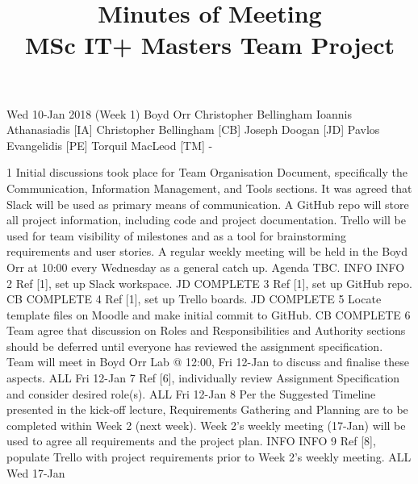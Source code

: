 \documentclass[a4paper, 12pt]{article}
\title{Minutes of Meeting \\ MSc IT+ Masters Team Project}
\date{}
\begin{document}
	\maketitle
	\momtoptable
	{Wed 10-Jan 2018 (Week 1)}
	{Boyd Orr}
	{Christopher Bellingham}
	{Ioannis Athanasiadis [IA]\newline
	Christopher Bellingham [CB]\newline
	Joseph Doogan [JD]\newline
	Pavlos Evangelidis [PE]\newline
	Torquil MacLeod [TM]}
	{-}

	\begin{momitems}
		\momitem
		{1}
		{Initial discussions took place for Team Organisation Document, specifically the Communication, Information Management, and Tools sections. It was agreed that Slack will be used as primary means of communication. A GitHub repo will store all project information, including code and project documentation. Trello will be used for team visibility of milestones and as a tool for brainstorming requirements and user stories. A regular weekly meeting will be held in the Boyd Orr at 10:00 every Wednesday as a general catch up. Agenda TBC.}
		{INFO}
		{INFO}
		\momitem
		{2}
		{Ref [1], set up Slack workspace.}
		{JD}
		{COMPLETE}
		\momitem
		{3}
		{Ref [1], set up GitHub repo.}
		{CB}
		{COMPLETE}
		\momitem
		{4}
		{Ref [1], set up Trello boards.}
		{JD}
		{COMPLETE}
		\momitem
		{5}
		{Locate template files on Moodle and make initial commit to GitHub.}
		{CB}
		{COMPLETE}
		\momitem
		{6}
		{Team agree that discussion on Roles and Responsibilities and Authority sections should be deferred until everyone has reviewed the assignment specification. Team will meet in Boyd Orr Lab @ 12:00, Fri 12-Jan to discuss and finalise these aspects.}
		{ALL}
		{Fri 12-Jan}
		\momitem
		{7}
		{Ref [6], individually review Assignment Specification and consider desired role(s).}
		{ALL}
		{Fri 12-Jan}
		\momitem
		{8}
		{Per the Suggested Timeline presented in the kick-off lecture, Requirements Gathering and Planning are to be completed within Week 2 (next week). Week 2's weekly meeting (17-Jan) will be used to agree all requirements and the project plan.}
		{INFO}
		{INFO}
		\momitem
		{9}
		{Ref [8], populate Trello with project requirements prior to Week 2's weekly meeting.}
		{ALL}
		{Wed 17-Jan}
	\end{momitems}
\end{document}
